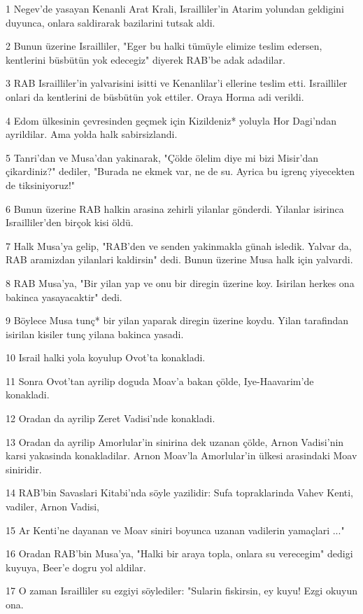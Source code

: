 \par 1 Negev'de yasayan Kenanli Arat Krali, Israilliler'in Atarim yolundan geldigini duyunca, onlara saldirarak bazilarini tutsak aldi.
\par 2 Bunun üzerine Israilliler, "Eger bu halki tümüyle elimize teslim edersen, kentlerini büsbütün yok edecegiz" diyerek RAB'be adak adadilar.
\par 3 RAB Israilliler'in yalvarisini isitti ve Kenanlilar'i ellerine teslim etti. Israilliler onlari da kentlerini de büsbütün yok ettiler. Oraya Horma adi verildi.
\par 4 Edom ülkesinin çevresinden geçmek için Kizildeniz* yoluyla Hor Dagi'ndan ayrildilar. Ama yolda halk sabirsizlandi.
\par 5 Tanri'dan ve Musa'dan yakinarak, "Çölde ölelim diye mi bizi Misir'dan çikardiniz?" dediler, "Burada ne ekmek var, ne de su. Ayrica bu igrenç yiyecekten de tiksiniyoruz!"
\par 6 Bunun üzerine RAB halkin arasina zehirli yilanlar gönderdi. Yilanlar isirinca Israilliler'den birçok kisi öldü.
\par 7 Halk Musa'ya gelip, "RAB'den ve senden yakinmakla günah isledik. Yalvar da, RAB aramizdan yilanlari kaldirsin" dedi. Bunun üzerine Musa halk için yalvardi.
\par 8 RAB Musa'ya, "Bir yilan yap ve onu bir diregin üzerine koy. Isirilan herkes ona bakinca yasayacaktir" dedi.
\par 9 Böylece Musa tunç* bir yilan yaparak diregin üzerine koydu. Yilan tarafindan isirilan kisiler tunç yilana bakinca yasadi.
\par 10 Israil halki yola koyulup Ovot'ta konakladi.
\par 11 Sonra Ovot'tan ayrilip doguda Moav'a bakan çölde, Iye-Haavarim'de konakladi.
\par 12 Oradan da ayrilip Zeret Vadisi'nde konakladi.
\par 13 Oradan da ayrilip Amorlular'in sinirina dek uzanan çölde, Arnon Vadisi'nin karsi yakasinda konakladilar. Arnon Moav'la Amorlular'in ülkesi arasindaki Moav siniridir.
\par 14 RAB'bin Savaslari Kitabi'nda söyle yazilidir: Sufa topraklarinda Vahev Kenti, vadiler, Arnon Vadisi,
\par 15 Ar Kenti'ne dayanan ve Moav siniri boyunca uzanan vadilerin yamaçlari ..."
\par 16 Oradan RAB'bin Musa'ya, "Halki bir araya topla, onlara su verecegim" dedigi kuyuya, Beer'e dogru yol aldilar.
\par 17 O zaman Israilliler su ezgiyi söylediler: "Sularin fiskirsin, ey kuyu! Ezgi okuyun ona.
